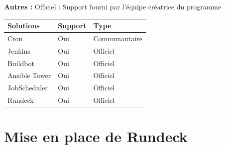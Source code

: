 \documentclass[12pt]{article}
\begin{document}
\vspace{0.5cm}

\textbf{Autres :}
Officiel : Support fourni par l'équipe créatrice du programme
\vspace{0.2cm}
\\
\begin{center}
\begin{tabular}{|l|l|l|}
\hline
Solutions     & Support & Type          \\ \hline
Cron          & Oui     & Communautaire \\ \hline
Jenkins       & Oui     & Officiel      \\ \hline
Buildbot      & Oui     & Officiel      \\ \hline
Ansible Tower & Oui     & Officiel      \\ \hline
JobScheduler  & Oui     & Officiel      \\ \hline
Rundeck       & Oui     & Officiel      \\ \hline
\end{tabular}
\end{center}

\section{Mise en place de Rundeck}
\end{document}
